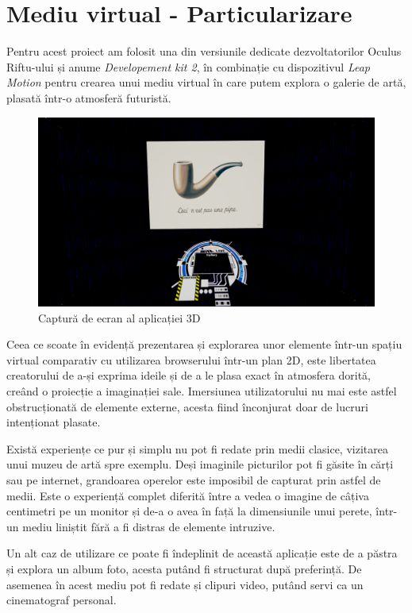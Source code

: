 \chapter{Mediu virtual - Particularizare}

Pentru acest proiect am folosit una din versiunile dedicate dezvoltatorilor Oculus Riftu-ului și anume \textit{Developement kit 2}, în combinație cu dispozitivul \textit{Leap Motion} pentru crearea unui mediu virtual în care putem explora o galerie de artă, plasată într-o atmosferă futuristă.

\begin{figure}[h]
  \centering
  \includegraphics[scale=0.28]{img/screenshot2.png}
  \caption{Captură de ecran al aplicației 3D}
\end{figure}

Ceea ce scoate în evidență prezentarea și explorarea unor elemente într-un spațiu virtual comparativ cu utilizarea browserului într-un plan 2D, este libertatea creatorului de a-și exprima ideile și de a le plasa exact în atmosfera dorită, creând o proiecție a imaginației sale. Imersiunea utilizatorului nu mai este astfel obstrucționată de elemente externe, acesta fiind înconjurat doar de lucruri intenționat plasate.

Există experiențe ce pur și simplu nu pot fi redate prin medii clasice, vizitarea unui muzeu de artă spre exemplu. Deși imaginile picturilor pot fi găsite în cărți sau pe internet, grandoarea operelor este imposibil de capturat prin astfel de medii. Este o experiență complet diferită între a vedea o imagine de câțiva centimetri pe un monitor și de-a o avea în față la dimensiunile unui perete, într-un mediu liniștit fără a fi distras de elemente intruzive.


Un alt caz de utilizare ce poate fi îndeplinit de această aplicație este de a păstra și explora un album foto, acesta putând fi structurat după preferință.
De asemenea în acest mediu pot fi redate și clipuri video,  putând servi ca un cinematograf personal.


